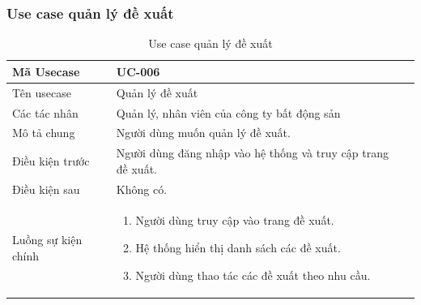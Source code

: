 \documentclass[12pt,a4paper]{article}
\begin{document}
    \subsubsection*{Use case quản lý đề xuất}
    \begin{table}[H]
        \centering
        \begin{tabular}{|p{3.5cm}|p{11.5cm}|c|}
            \hline
            Mã Usecase      & UC-006                                                       \\
            \hline
            Tên usecase     & Quản lý đề xuất                                              \\
            \hline
            Các tác nhân    & Quản lý, nhân viên của công ty bất động sản                  \\
            \hline
            Mô tả chung     & Người dùng muốn quản lý đề xuất.                             \\
            \hline

            Điều kiện trước & Người dùng đăng nhập vào hệ thống và truy cập trang đề xuất. \\
            \hline

            Điều kiện sau   & Không có.                                                    \\
            \hline

            Luồng sự kiện chính & \vspace{-.8cm}\begin{enumerate}
                                                    \item Người dùng truy cập vào trang đề xuất.
                                                    \item Hệ thống hiển thị danh sách các đề xuất.
                                                    \item Người dùng thao tác các đề xuất theo nhu cầu.
            \end{enumerate}
            \\
            \hline
        \end{tabular}
        \caption{Use case quản lý đề xuất}
    \end{table}

\end{document}
